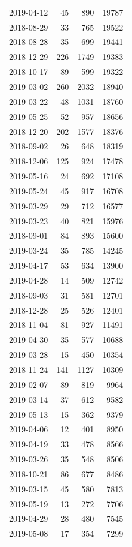\begin{tabular}{lrrr}
2019-04-12 & 45 & 890 & 19787 \\
2018-08-29 & 33 & 765 & 19522 \\
2018-08-28 & 35 & 699 & 19441 \\
2018-12-29 & 226 & 1749 & 19383 \\
2018-10-17 & 89 & 599 & 19322 \\
2019-03-02 & 260 & 2032 & 18940 \\
2019-03-22 & 48 & 1031 & 18760 \\
2019-05-25 & 52 & 957 & 18656 \\
2018-12-20 & 202 & 1577 & 18376 \\
2018-09-02 & 26 & 648 & 18319 \\
2018-12-06 & 125 & 924 & 17478 \\
2019-05-16 & 24 & 692 & 17108 \\
2019-05-24 & 45 & 917 & 16708 \\
2019-03-29 & 29 & 712 & 16577 \\
2019-03-23 & 40 & 821 & 15976 \\
2018-09-01 & 84 & 893 & 15600 \\
2019-03-24 & 35 & 785 & 14245 \\
2019-04-17 & 53 & 634 & 13900 \\
2019-04-28 & 14 & 509 & 12742 \\
2018-09-03 & 31 & 581 & 12701 \\
2018-12-28 & 25 & 526 & 12401 \\
2018-11-04 & 81 & 927 & 11491 \\
2019-04-30 & 35 & 577 & 10688 \\
2019-03-28 & 15 & 450 & 10354 \\
2018-11-24 & 141 & 1127 & 10309 \\
2019-02-07 & 89 & 819 & 9964 \\
2019-03-14 & 37 & 612 & 9582 \\
2019-05-13 & 15 & 362 & 9379 \\
2019-04-06 & 12 & 401 & 8950 \\
2019-04-19 & 33 & 478 & 8566 \\
2019-03-26 & 35 & 548 & 8506 \\
2018-10-21 & 86 & 677 & 8486 \\
2019-03-15 & 45 & 580 & 7813 \\
2019-05-19 & 13 & 272 & 7706 \\
2019-04-29 & 28 & 480 & 7545 \\
2019-05-08 & 17 & 354 & 7299 \\

\end{tabular}
